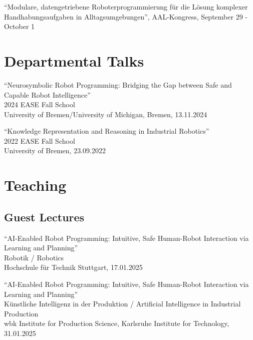 \documentclass[11pt]{article} %
\begin{document}
``Modulare, datengetriebene Roboterprogrammierung für die Lösung komplexer Handhabungsaufgaben in Alltagsumgebungen'', AAL-Kongress, September 29 - October 1

\section*{Departmental Talks}

``Neurosymbolic Robot Programming: Bridging the Gap between Safe and Capable Robot Intelligence''\\
2024 EASE Fall School\\
University of Bremen/University of Michigan, Bremen, 13.11.2024

\medskip

``Knowledge Representation and Reasoning in Industrial Robotics''\\
2022 EASE Fall School\\
University of Bremen, 23.09.2022


\section*{Teaching}

\subsection*{Guest Lectures}


``AI-Enabled Robot Programming: Intuitive, Safe Human-Robot Interaction via Learning and Planning''\\
Robotik / Robotics\\
Hochschule für Technik Stuttgart, 17.01.2025

\medskip

``AI-Enabled Robot Programming: Intuitive, Safe Human-Robot Interaction via Learning and Planning''\\
Künstliche Intelligenz in der Produktion / Artificial Intelligence in Industrial Production\\
wbk Institute for Production Science, Karlsruhe Institute for Technology, 31.01.2025

\end{document}

